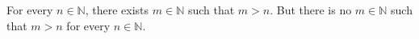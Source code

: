 For every $n \in \mathbb{N}$, there exists $m \in \mathbb{N}$ such that $m > n$.
But there is no $m \in \mathbb{N}$ such that $m > n$ for every $n \in \mathbb{N}$.